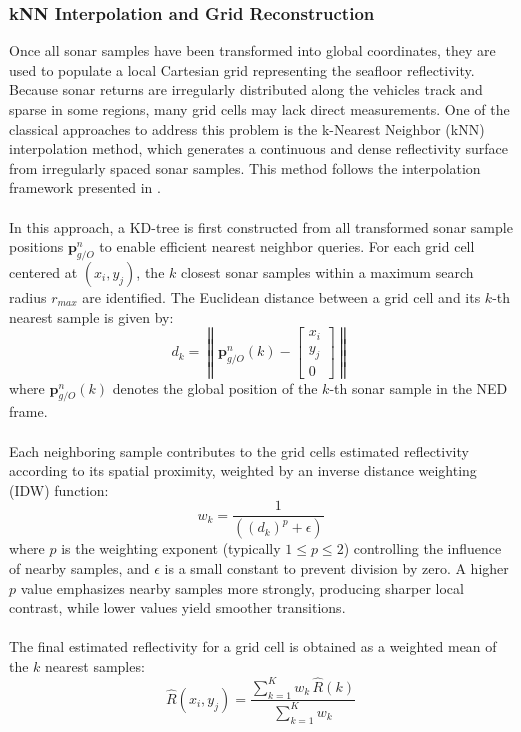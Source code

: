 \subsubsection{kNN Interpolation and Grid Reconstruction}
Once all sonar samples have been transformed into global coordinates, they are used to populate a local Cartesian grid representing the seafloor reflectivity. Because sonar returns are irregularly distributed along the vehicles track and sparse in some regions, many grid cells may lack direct measurements. One of the classical approaches to address this problem is the k-Nearest Neighbor (kNN) interpolation method, which generates a continuous and dense reflectivity surface from irregularly spaced sonar samples. This method follows the interpolation framework presented in \cite{side_scan_sonar_master_thesis, kd_tree}.  
\\ \\
In this approach, a KD-tree is first constructed from all transformed sonar sample positions $\mathbf{p}_{g/O}^{n}$ to enable efficient nearest neighbor queries. For each grid cell centered at $(x_i, y_j)$, the $k$ closest sonar samples within a maximum search radius $r_{max}$ are identified. The Euclidean distance between a grid cell and its $k$-th nearest sample is given by:
$$
    d_k = \left\| 
    \mathbf{p}_{g/O}^{n}(k) -
    \begin{bmatrix} x_i \\ y_j \\ 0 \end{bmatrix}
    \right\|
$$
where $\mathbf{p}_{g/O}^{n}(k)$ denotes the global position of the $k$-th sonar sample in the NED frame.  
\\ \\
Each neighboring sample contributes to the grid cells estimated reflectivity according to its spatial proximity, weighted by an inverse distance weighting (IDW) function:
$$
    w_k = \frac{1}{((d_k)^p + \epsilon)}
$$
where $p$ is the weighting exponent (typically $1 \leq p \leq 2$) controlling the influence of nearby samples, and $\epsilon$ is a small constant to prevent division by zero. A higher $p$ value emphasizes nearby samples more strongly, producing sharper local contrast, while lower values yield smoother transitions.  
\\ \\
The final estimated reflectivity for a grid cell is obtained as a weighted mean of the $k$ nearest samples:
$$
    \hat{R}(x_i, y_j) =
    \frac{\sum_{k=1}^{K} w_k \, \hat{R}(k)}
         {\sum_{k=1}^{K} w_k}
$$
